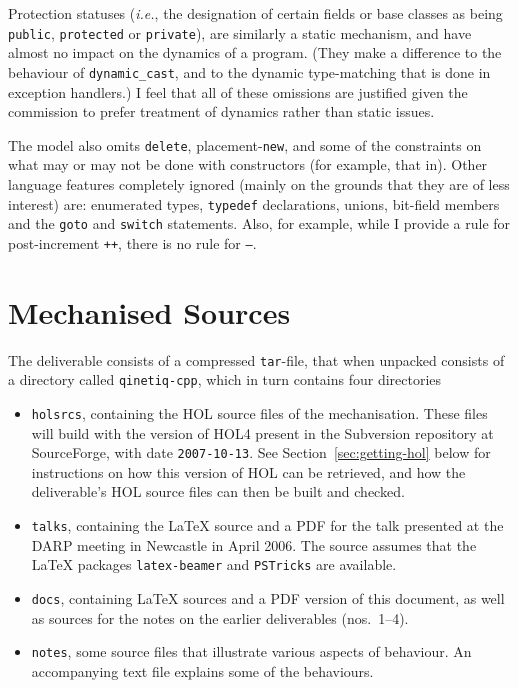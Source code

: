\documentclass[11pt]{article}
\newcommand{\ie}{\emph{i.e.}}
\begin{document}
Protection statuses (\ie, the designation of certain fields or base
classes as being \texttt{public}, \texttt{protected} or
\texttt{private}), are similarly a static mechanism, and have almost
no impact on the dynamics of a program.  (They make a difference to
the behaviour of \texttt{dynamic_cast}, and to the dynamic
type-matching that is done in exception handlers.)  I feel that all of
these omissions are justified given the commission to prefer treatment
of dynamics rather than static issues.

The model also omits \texttt{delete}, placement-\texttt{new}, and some
of the constraints on what may or may not be done with constructors
(for example, that in\cite[\S12.1,~para~15]{cpp-standard-iso14882}).
Other language features completely ignored (mainly on the grounds that
they are of less interest) are: enumerated types, \texttt{typedef}
declarations, unions, bit-field members and the \texttt{goto} and
\texttt{switch} statements.  Also, for example, while I provide a rule
for post-increment \texttt{++}, there is no rule for \texttt{--}.

\appendix
\section{Mechanised Sources}
\label{sec:sources}

The deliverable consists of a compressed \texttt{tar}-file, that when
unpacked consists of a directory called \texttt{qinetiq-cpp}, which in
turn contains four directories
\begin{itemize}
\item \texttt{holsrcs}, containing the HOL source files of the
  mechanisation.  These files will build with the version of HOL4
  present in the Subversion repository at SourceForge, with date
  \texttt{2007-10-13}.  See Section~\ref{sec:getting-hol} below
  for instructions on how this version of HOL can be retrieved, and
  how the deliverable's HOL source files can then be built and
  checked.
\item \texttt{talks}, containing the \LaTeX{} source and a PDF for the
  talk presented at the DARP meeting in Newcastle in April 2006.  The
  source assumes that the \LaTeX{} packages \texttt{latex-beamer} and
  \texttt{PSTricks} are available.
\item \texttt{docs}, containing \LaTeX{} sources and a PDF version of
  this document, as well as sources for the notes on the earlier
  deliverables (nos.~1--4).
\item \texttt{notes}, some \cpp{} source files that illustrate various
  aspects of \cpp{} behaviour.  An accompanying text file explains some
  of the behaviours.
\end{itemize}
\end{document}
